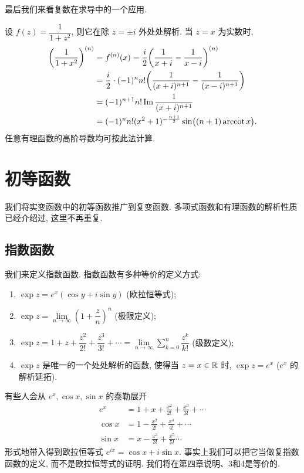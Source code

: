 最后我们来看复数在求导中的一个应用.

\begin{example}
	设 $f(z)=\dfrac1{1+z^2}$, 则它在除 $z=\pm i$ 外处处解析.
	当 $z=x$ 为实数时,
  \begin{align*}
    \biggl(\frac1{1+x^2}\biggr)^{(n)}&
      =f^{(n)}(x)=\frac i2\biggl(\frac1{x+i}-\frac1{x-i}\biggr)^{(n)}\\
    &=\frac i2\cdot(-1)^n n!\biggl(\frac1{(x+i)^{n+1}}-\frac1{(x-i)^{n+1}}\biggr)\\
    &=(-1)^{n+1}n!\operatorname{Im}\frac1{(x+i)^{n+1}}\\
    &=(-1)^nn!(x^2+1)^{-\frac{n+1}2}\sin\bigl((n+1)\operatorname{arccot} x\bigr).
  \end{align*}
	任意有理函数的高阶导数均可按此法计算.
\end{example}


\section{初等函数}

我们将实变函数中的初等函数推广到复变函数.
多项式函数和有理函数的解析性质已经介绍过, 这里不再重复.

\subsection{指数函数}

我们来定义指数函数. 
指数函数有多种等价的定义方式:
\begin{enumerate}
	\item $\exp z=e^x(\cos y+i\sin y)$ (欧拉恒等式);
	\item $\exp z=\lim\limits_{n\to\infty}\left(1+\dfrac zn\right)^n$ (极限定义);
	\item $\exp z=1+z+\dfrac{z^2}{2!}+\dfrac{z^3}{3!}+\cdots
	=\lim\limits_{n\to\infty}\sum\limits_{k=0}^n\dfrac{z^k}{k!}$ (级数定义);
	\item $\exp z$ 是唯一的一个处处解析的函数, 使得当 $z=x\in{\mathbb{R}}$ 时, $\exp z=e^x$ ($e^x$ 的解析延拓).
\end{enumerate}

有些人会从 $e^x,\cos x,\sin x$ 的泰勒展开
\begin{align*}
	e^x&=1+x+\frac{x^2}{2!}+\frac{x^3}{3!}+\cdots\\
	\cos x&=1-\frac{x^2}{2!}+\frac{x^4}{4!}+\cdots\\
	\sin x&=x-\frac{x^3}{3!}+\frac{x^5}{5!}\cdots
\end{align*}
形式地带入得到欧拉恒等式 $e^{ix}=\cos x+i\sin x$.
事实上我们可以把它当做复指数函数的定义, 而不是欧拉恒等式的证明.
我们将在第四章说明、\enumnum3和\enumnum4是等价的.

